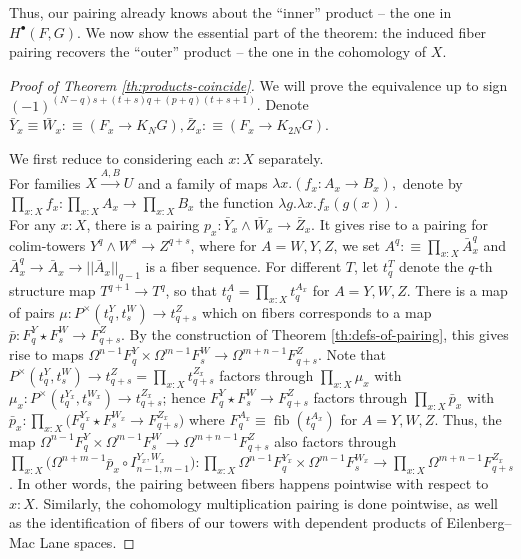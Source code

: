 \documentclass{amsart}
\theoremstyle{definition}
\newcommand{\fib}{\operatorname{fib}}
\newcommand{\depfun}[2]{\prod\limits_{#1}^{}{#2}}
\newcommand{\join}{\star}
\begin{document}
Thus, our pairing already knows about the ``inner'' product -- the one in $H^\bullet(F, G)$. We now show the essential part of the theorem: the induced fiber pairing recovers the ``outer'' product -- the one in the cohomology of $X$.
\begin{proof}[Proof of Theorem \ref{th:products-coincide}]
    We will prove the equivalence up to sign $(-1)^{(N-q)s+(t+s)q+(p+q)(t+s+1)}$.
    Denote $\bar{Y}_x \equiv \bar{W}_x :\equiv ({F_x \to K_N G}), \bar{Z}_x :\equiv (F_x \to K_{2N}G)$.

    We first reduce to considering each $x:X$ separately.
    \\
    For families $X \xrightarrow{A,B} U $ and a family of maps $\lambda x.(f_x:A_x \to B_x),$ denote by $\depfun{x:X}{f_x}: \depfun{x:X}{A_x} \to \depfun{x:X}{B_x}$ the function $\lambda g.\lambda x.f_x(g(x))$.
    \\
    For any $x:X$, there is a pairing $p_x: \bar{Y}_x \wedge \bar{W}_x \to \bar{Z}_x$.
    It gives rise to a pairing for colim-towers $Y^q \wedge W^{s} \to Z^{q+s}$, where for $A = W, Y, Z$, we set $A^q :\equiv \depfun{x:X}{\bar{A}^q_x}$ and $\bar{A}_x^q \to \bar{A}_x \to ||\bar{A}_x||_{q-1}$ is a fiber sequence.
    For different $T$, let $t^T_q$ denote the $q$-th structure map $T^{q+1} \to T^{q}$, so that $t^A_q = \depfun{x:X}{{t^{A_x}_q}}$ for $A = Y, W, Z$.
    There is a map of pairs $\mu: P^\times(t_q^Y, t_s^W) \to t_{q+s}^Z$ which on fibers corresponds to a map $\bar{p}: F^Y_q \join F^W_s \to F^{Z}_{q+s}$. By the construction of Theorem \ref{th:defs-of-pairing}, this gives rise to maps $\Omega^{n-1} F^Y_q \times \Omega^{m-1} F^W_s \to \Omega^{m+n-1} F^{Z}_{q+s}$.
    Note that $P^\times(t_q^Y, t_s^W) \to t_{q+s}^Z = \depfun{x:X}{{t_{q+s}^{Z_x}}}$ factors through $\depfun{x:X}{\mu_x}$ with $\mu_x : P^\times({t_q^{Y_x}}, {t_s^{W_x}}) \to {t_{q+s}^{Z_x}}$; hence $F^Y_q \join F^W_s \to F^{Z}_{q+s}$ factors through $\depfun{x:X}{\bar{p}_x}$ with $\bar{p}_x : \depfun{x:X}{({F^{Y_x}_q} \join {F^{W_x}_s} \to {F^{Z_x}_{q+s}}})$ where ${F^{A_x}_q} \equiv \fib({t^{A_x}_q})$ for $A = Y, W , Z$.
    Thus, the map $\Omega^{n-1} F^Y_q \times \Omega^{m-1} F^W_s \to \Omega^{m+n-1} F^{Z}_{q+s}$ also factors through $\depfun{x:X}{(\Omega^{n+m-1}\bar{p}_x \circ I^{Y_x,W_x}_{n-1,m-1}}):
    \depfun{x:X}{\Omega^{n-1} {F^{Y_x}_q} \times \Omega^{m-1} {F^{W_x}_s}} \to \depfun{x:X}{\Omega^{m+n-1} {F^{Z_x}_{q+s}}}$.
    In other words, the pairing between fibers happens pointwise with respect to $x:X$. Similarly, the cohomology multiplication pairing is done pointwise, as well as the identification of fibers of our towers with
    dependent products of Eilenberg--Mac Lane spaces.


\end{proof}
\end{document}
